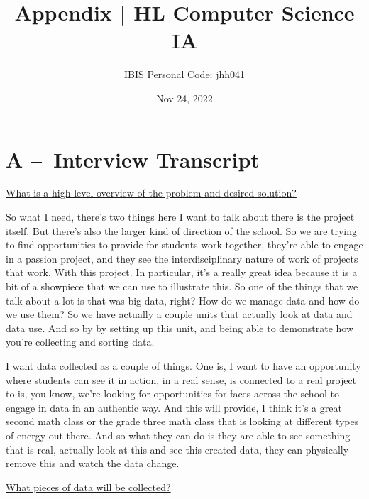 \documentclass[titlepage]{article}
\title{Appendix | HL Computer Science IA}
\author{IBIS Personal Code: jhh041}
\date{Nov 24, 2022}
\begin{document}
\maketitle

\tableofcontents
\pagebreak

\section{A – Interview Transcript}

\begin{center}
  \vspace*{3mm}
  \underline{What is a high-level overview of the problem and desired solution?}
  \vspace*{1mm}
\end{center}
So what I need, there's two things here I want to talk about there is the project itself. But there's also the larger kind of direction of the school. So we are trying to find opportunities to provide for students work together, they're able to engage in a passion project, and they see the interdisciplinary nature of work of projects that work. With this project. In particular, it's a really great idea because it is a bit of a showpiece that we can use to illustrate this. So one of the things that we talk about a lot is that was big data, right? How do we manage data and how do we use them? So we have actually a couple units that actually look at data and data use. And so by by setting up this unit, and being able to demonstrate how you're collecting and sorting data.

I want data collected as a couple of things. One is, I want to have an opportunity where students can see it in action, in a real sense, is connected to a real project to is, you know, we're looking for opportunities for faces across the school to engage in data in an authentic way. And this will provide, I think it's a great second math class or the grade three math class that is looking at different types of energy out there. And so what they can do is they are able to see something that is real, actually look at this and see this created data, they can physically remove this and watch the data change.

\begin{center}
  \vspace*{3mm}
  \underline{What pieces of data will be collected?}
  \vspace*{1mm}
\end{center}
\end{document}
